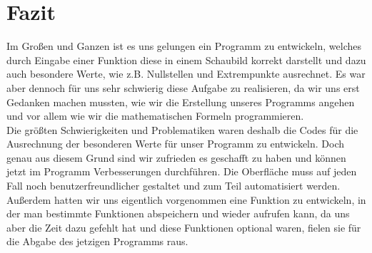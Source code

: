 
\ihead{\headmark}
\cfoot{\pagemark}


\section{Fazit}

Im Großen und Ganzen ist es uns gelungen ein Programm zu entwickeln, welches durch Eingabe einer Funktion diese in einem Schaubild korrekt darstellt und dazu auch besondere Werte, wie z.B. Nullstellen und Extrempunkte ausrechnet. Es war aber dennoch für uns sehr schwierig diese Aufgabe zu realisieren, da wir uns erst Gedanken machen mussten, wie wir die Erstellung unseres Programms angehen und vor allem wie wir die mathematischen Formeln programmieren.\\

Die größten Schwierigkeiten und Problematiken waren deshalb die Codes für die Ausrechnung der besonderen Werte für unser Programm zu entwickeln. 
Doch genau aus diesem Grund sind wir zufrieden es geschafft zu haben und können jetzt im Programm Verbesserungen durchführen. Die Oberfläche muss auf jeden Fall noch benutzerfreundlicher gestaltet und zum Teil automatisiert werden.\\

Außerdem hatten wir uns eigentlich vorgenommen eine Funktion zu entwickeln, in der man bestimmte Funktionen abspeichern und wieder aufrufen kann, da uns aber die Zeit dazu gefehlt hat und diese Funktionen optional waren, fielen sie für die Abgabe des jetzigen Programms raus.
